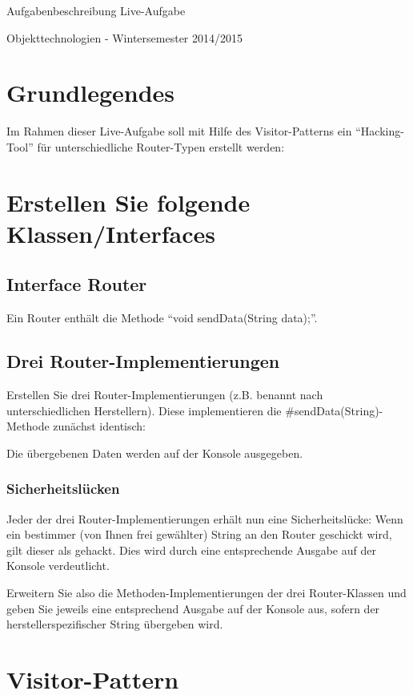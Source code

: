 \documentclass[oneside,a4paper]{scrartcl}
\author{Johannes Schneider}
\begin{document}
\centerline{\sc \large Aufgabenbeschreibung Live-Aufgabe}
\vspace{.5pc}
\centerline{\sc Objekttechnologien - Wintersemester 2014/2015}
\vspace{2pc}



\section{Grundlegendes}

Im Rahmen dieser Live-Aufgabe soll mit Hilfe des Visitor-Patterns ein \enquote{Hacking-Tool} für
unterschiedliche Router-Typen erstellt werden:


\section{Erstellen Sie folgende Klassen/Interfaces}
\subsection{Interface Router}

Ein Router enthält die Methode \enquote{void sendData(String data);}.

\subsection{Drei Router-Implementierungen}
Erstellen Sie drei Router-Implementierungen (z.B. benannt nach unterschiedlichen Herstellern). Diese
implementieren die \#sendData(String)-Methode zunächst identisch:

Die übergebenen Daten werden auf der Konsole ausgegeben.

\subsubsection{Sicherheitslücken}
Jeder der drei Router-Implementierungen erhält nun eine Sicherheitslücke:
Wenn ein bestimmer (von Ihnen frei gewählter) String an den Router geschickt wird, 
gilt dieser als gehackt. Dies wird durch eine entsprechende Ausgabe auf der Konsole verdeutlicht.

Erweitern Sie also die Methoden-Implementierungen der drei Router-Klassen und geben Sie jeweils eine entsprechend Ausgabe auf der Konsole
aus, sofern der herstellerspezifischer String übergeben wird.


\section{Visitor-Pattern}
\end{document}
